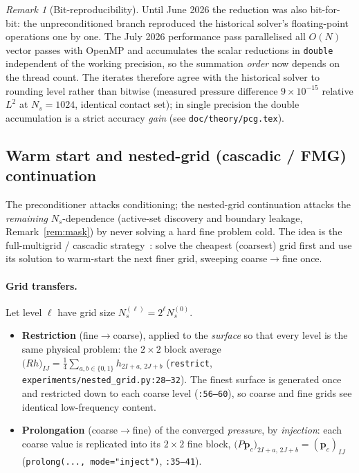 \documentclass[11pt,a4paper]{article}
\newcommand{\pp}{\mathbf{p}}
\newcommand{\code}[1]{\texttt{#1}}
\theoremstyle{definition}
\theoremstyle{remark}
\newtheorem{remark}{Remark}
\begin{document}
\begin{remark}[Bit-reproducibility]
Until June 2026 the reduction was also bit-for-bit: the unpreconditioned branch
reproduced the historical solver's floating-point operations one by one. The
July 2026 performance pass parallelised all $O(N)$ vector passes with OpenMP
and accumulates the scalar reductions in \code{double} independent of the
working precision, so the summation \emph{order} now depends on the thread
count. The iterates therefore agree with the historical solver to rounding
level rather than bitwise (measured pressure difference
$9\times10^{-15}$ relative $L^2$ at $N_s=1024$, identical contact set); in
single precision the double accumulation is a strict accuracy \emph{gain}
(see \code{doc/theory/pcg.tex}).
\end{remark}

\subsection{Warm start and nested-grid (cascadic / FMG) continuation}
\label{sec:nested}

The preconditioner attacks conditioning; the nested-grid continuation attacks the
\emph{remaining} $N_s$-dependence (active-set discovery and boundary leakage,
Remark~\ref{rem:mask}) by never solving a hard fine problem cold. The idea is the
full-multigrid / cascadic strategy~\cite{Brandt1977,BornemannDeuflhard1996}: solve
the cheapest (coarsest) grid first and use its solution to warm-start the next
finer grid, sweeping coarse$\to$fine once.

\paragraph{Grid transfers.}
Let level $\ell$ have grid size $N_s^{(\ell)}=2^{\ell}N_s^{(0)}$.
\begin{itemize}
\item \textbf{Restriction} (fine$\to$coarse), applied to the \emph{surface} so
that every level is the same physical problem: the $2\times2$ block average
$\big(R h\big)_{IJ}=\tfrac14\sum_{a,b\in\{0,1\}}h_{2I+a,\,2J+b}$
(\code{restrict}, \code{experiments/nested\_grid.py:28--32}). The finest surface
is generated once and restricted down to each coarse level (\code{:56--60}), so
coarse and fine grids see identical low-frequency content.
\item \textbf{Prolongation} (coarse$\to$fine) of the converged \emph{pressure},
by \emph{injection}: each coarse value is replicated into its $2\times2$ fine
block, $\big(P\pp_c\big)_{2I+a,\,2J+b}=(\pp_c)_{IJ}$
(\code{prolong(..., mode="inject")}, \code{:35--41}).
\end{itemize}
\end{document}
